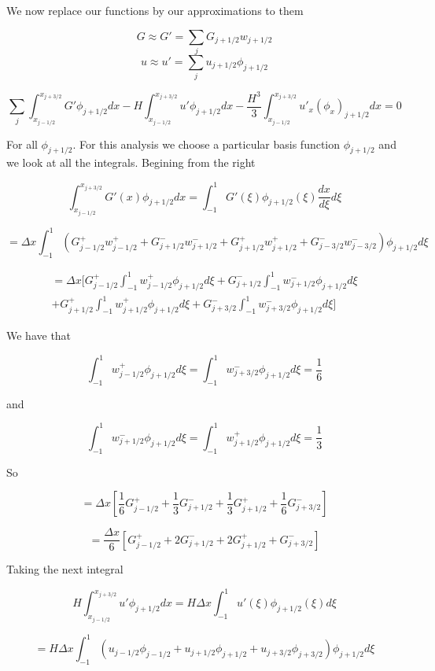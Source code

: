 \documentclass[12pt]{article}
\begin{document}
We now replace our functions by our approximations to them

\[G \approx G' = \sum_{j}G_{j+1/2}w_{j+1/2}\]
\[u \approx u' = \sum_{j}u_{j+1/2}\phi_{j+1/2}\]

\[\sum_{j}\int_{x_{j-1/2}}^{x_{j+3/2}} G'\phi_{j+1/2} dx - H\int_{x_{j-1/2}}^{x_{j+3/2}} u'\phi_{j+1/2} dx -  \frac{H^3}{3}\int_{x_{j-1/2}}^{x_{j+3/2}}u'_{x}(\phi_{x})_{j+1/2}dx = 0 \]

For all $\phi_{j+1/2}$. For this analysis we choose a particular basis function $\phi_{j+1/2}$ and we look at all the integrals. Begining from the right

\[\int_{x_{j-1/2}}^{x_{j+3/2}} G'(x)\phi_{j+1/2} dx = \int_{-1}^{1} G'(\xi)\phi_{j+1/2}(\xi) \frac{d x}{d\xi}d\xi\]

\[= \Delta x \int_{-1}^{1} \left(G^+_{j- 1/2}w^+_{j - 1/2} + G^-_{j+ 1/2}w^-_{j + 1/2} + G^+_{j+ 1/2}w^+_{j + 1/2} + G^-_{j- 3/2}w^-_{j - 3/2}     \right)\phi_{j+1/2} d\xi\]

\begin{multline}
= \Delta x [G^+_{j- 1/2} \int_{-1}^{1} w^+_{j - 1/2}\phi_{j+1/2} d\xi + G^-_{j+ 1/2} \int_{-1}^{1} w^-_{j + 1/2}\phi_{j+1/2} d\xi  \\+ G^+_{j+ 1/2} \int_{-1}^{1} w^+_{j + 1/2}\phi_{j+1/2} d\xi + G^-_{j+ 3/2} \int_{-1}^{1} w^-_{j + 3/2}\phi_{j+1/2} d\xi ]
\end{multline}


We have that

\[\int_{-1}^{1} w^+_{j - 1/2}\phi_{j+1/2} d\xi = \int_{-1}^{1} w^-_{j + 3/2}\phi_{j+1/2} d\xi  = \frac{1}{6}\]

and 

\[\int_{-1}^{1} w^-_{j + 1/2}\phi_{j+1/2} d\xi = \int_{-1}^{1} w^+_{j + 1/2}\phi_{j+1/2} d\xi = \frac{1}{3} \]

So

\[= \Delta x \left[\frac{1}{6}G^+_{j- 1/2} +  \frac{1}{3}G^-_{j+ 1/2} +  \frac{1}{3}G^+_{j+ 1/2}  +  \frac{1}{6}G^-_{j+ 3/2}\right]\]

\[= \frac{\Delta x}{6}  \left[G^+_{j- 1/2} +  2G^-_{j+ 1/2} +  2G^+_{j+ 1/2}  +  G^-_{j+ 3/2}\right]\]

 Taking the next integral

\[H\int_{x_{j-1/2}}^{x_{j+3/2}} u'\phi_{j+1/2} dx = H \Delta x \int_{-1}^{1} u'(\xi)\phi_{j+1/2}(\xi) d\xi\]

\[= H\Delta x \int_{-1}^{1} \left(u_{j- 1/2}\phi_{j - 1/2} + u_{j+1/2}\phi_{j+1/2} +u_{j+ 3/2}\phi_{j+ 3/2} \right)\phi_{j + 1/2} d\xi\]
\end{document}
